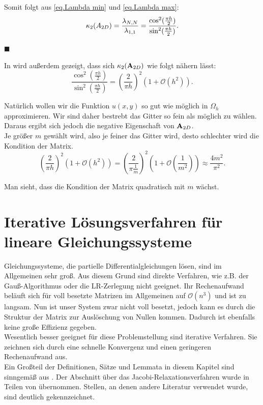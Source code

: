 Somit folgt aus \autoref{eq.Lambda min} und \autoref{eq.Lambda max}:
\begin{equation}
\kappa_{2} (A_{2D}) = \frac {\lambda_{N,N}} {\lambda_{1,1}} = \frac {\cos^{2} (\frac {\pi h} {2})} {\sin^{2} (\frac {\pi h} {2})}. \notag
\end{equation}
\begin{flushright}
$\blacksquare$
\end{flushright}
In \cite{DR3} wird außerdem gezeigt, dass sich $\kappa_{2}({\textbf{A}}_{2D})$ wie folgt nähern lässt:
\begin{equation}
\frac {\cos^{2} (\frac {\pi h} {2})} {\sin^{2} (\frac {\pi h} {2})} = \left( \frac {2} {\pi h} \right)^{2} (1 + \mathcal{O}(h^{2})).
\end{equation}

Natürlich wollen wir die Funktion $u(x,y)$ so gut wie möglich in $\Omega_{h}$ approximieren. Wir sind daher bestrebt das Gitter so fein als möglich zu wählen. Daraus ergibt sich jedoch die negative Eigenschaft von ${\textbf{A}}_{2D}$. \\
Je größer $m$ gewählt wird, also je feiner das Gitter wird, desto schlechter wird die Kondition der Matrix.
\begin{equation}
\left( \frac {2} {\pi h} \right)^{2} (1 + \mathcal{O}(h^{2})) = \left( \frac {2} {\pi \frac {1} {m}} \right)^{2} (1 + \mathcal{O}(\frac {1} {m^{2}})) \approx \frac {4m^{2}} {\pi^{2}}. \label{eq.kondition von PMatrix}
\end{equation}

Man sieht, dass die Kondition der Matrix quadratisch mit $m$ wächst.

\chapter{Iterative Lösungsverfahren für lineare Gleichungssysteme}\label{c.IterativeVerfahren}

Gleichungssysteme, die partielle Differentialgleichungen lösen, sind im Allgemeinen sehr groß. Aus diesem Grund sind direkte Verfahren, wie z.B. der Gauß-Algorithmus oder die LR-Zerlegung nicht geeignet. Ihr Rechenaufwand beläuft sich für voll besetzte Matrizen im Allgemeinen auf $\mathcal{O}(n^{3})$ und ist zu langsam. Nun ist unser System zwar nicht voll besetzt, jedoch kann es durch die Struktur der Matrix zur Auslöschung von Nullen kommen. Dadurch ist ebenfalls keine große Effizienz gegeben.\\
Wesentlich besser geeignet für diese Problemstellung sind iterative Verfahren. Sie zeichnen sich durch eine schnelle Konvergenz und einen geringeren Rechenaufwand aus.\\
Ein Großteil der Definitionen, Sätze und Lemmata in diesem Kapitel sind sinngemäß aus \cite{DR4}. Der Abschnitt über das Jacobi-Relaxationsverfahren wurde in Teilen von \cite{SAAD2} übernommen. Stellen, an denen andere Literatur verwendet wurde, sind deutlich gekennzeichnet.

